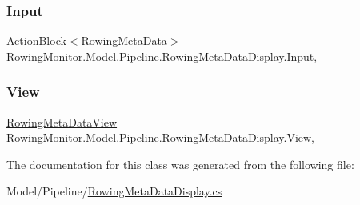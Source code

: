 \subsubsection{\texorpdfstring{Input}{Input}}
{\footnotesize\ttfamily Action\+Block$<$\hyperlink{struct_rowing_monitor_1_1_model_1_1_util_1_1_rowing_meta_data}{Rowing\+Meta\+Data}$>$ Rowing\+Monitor.\+Model.\+Pipeline.\+Rowing\+Meta\+Data\+Display.\+Input\hspace{0.3cm}{\ttfamily [get]}, {\ttfamily [set]}}

\mbox{\label{class_rowing_monitor_1_1_model_1_1_pipeline_1_1_rowing_meta_data_display_a669135bac2cb6137ae5f0bff1122d02f}} 
\subsubsection{\texorpdfstring{View}{View}}
{\footnotesize\ttfamily \hyperlink{class_rowing_monitor_1_1_view_1_1_rowing_meta_data_view}{Rowing\+Meta\+Data\+View} Rowing\+Monitor.\+Model.\+Pipeline.\+Rowing\+Meta\+Data\+Display.\+View\hspace{0.3cm}{\ttfamily [get]}, {\ttfamily [set]}}



The documentation for this class was generated from the following file\+:\begin{DoxyCompactItemize}
\item 
Model/\+Pipeline/\hyperlink{_rowing_meta_data_display_8cs}{Rowing\+Meta\+Data\+Display.\+cs}\end{DoxyCompactItemize}
